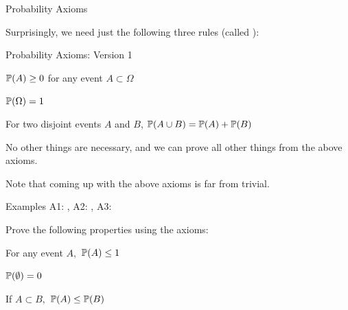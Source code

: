 \begin{frame}{Probability Axioms}

\plitemsep 0.1in

\bci 

\item<1-> Surprisingly, we need just the following three rules (called ):

\medskip

{
\begin{block}{Probability Axioms: Version 1}

\bce[{A}1.] 
\item {} $\mathbb{P}( A ) \geq 0$ for any event $A \subset \Omega$
\item {} $\mathbb{P}( \Omega ) = 1$
\item {} For two disjoint events $A$ and $B$, $\mathbb{P}( A \cup B ) = \mathbb{P}( A ) + \mathbb{P}( B )$
\ece
\end{block}
}

\item<3-> No other things are necessary, and we can prove all other 
things from the above axioms.

\item<4-> Note that coming up with the above axioms is far from trivial. 

\eci

\end{frame}

\begin{frame}{Examples}
A1: , A2: , A3: 

Prove the following properties using the axioms: \hfill {}

\plitemsep 0.1in


\bce 
\item For any event $A,$ $\mathbb{P}( A ) \leq 1$

\item $\mathbb{P}( \emptyset ) = 0$

\item If $A \subset B,$ $\mathbb{P}( A ) \leq \mathbb{P}( B )$
\ece

\end{frame}

